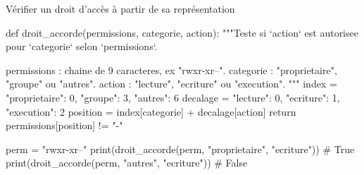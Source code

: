 \begin{codereference}{Vérifier un droit d'accès à partir de sa représentation}
\begin{python}
def droit_accorde(permissions, categorie, action):
    """Teste si `action` est autorisee pour `categorie` selon `permissions`.

    permissions : chaine de 9 caracteres, ex "rwxr-xr--".
    categorie : "proprietaire", "groupe" ou "autres".
    action : "lecture", "ecriture" ou "execution".
    """
    index = {"proprietaire": 0, "groupe": 3, "autres": 6}
    decalage = {"lecture": 0, "ecriture": 1, "execution": 2}
    position = index[categorie] + decalage[action]
    return permissions[position] != "-"

perm = "rwxr-xr--"
print(droit_accorde(perm, "proprietaire", "ecriture"))  # True
print(droit_accorde(perm, "autres", "ecriture"))         # False
\end{python}
\end{codereference}




